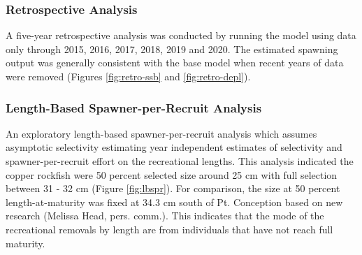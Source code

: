 \documentclass[11pt,
  english,
  a4paper,
]{article}
\begin{document}
\leavevmode\tagmcend\tagstructend\par


\hypertarget{retrospective-analysis}{%
\subsubsection{Retrospective Analysis}\label{retrospective-analysis}}

\leavevmode\tagmcend\tagstructend


A five-year retrospective analysis was conducted by running the model using data only through 2015, 2016, 2017, 2018, 2019 and 2020. The estimated spawning output was generally consistent with the base model when recent years of data were removed (Figures \ref{fig:retro-ssb} and \ref{fig:retro-depl}).

\leavevmode\tagmcend\tagstructend\par


\hypertarget{length-based-spawner-per-recruit-analysis}{%
\subsubsection{Length-Based Spawner-per-Recruit Analysis}\label{length-based-spawner-per-recruit-analysis}}

\leavevmode\tagmcend\tagstructend


An exploratory length-based spawner-per-recruit analysis which assumes asymptotic selectivity estimating year independent estimates of selectivity and spawner-per-recruit effort on the recreational lengths. This analysis indicated the copper rockfish were 50 percent selected size around 25 cm with full selection between 31 - 32 cm (Figure \ref{fig:lbspr}). For comparison, the size at 50 percent length-at-maturity was fixed at 34.3 cm south of Pt. Conception based on new research (Melissa Head, pers. comm.). This indicates that the mode of the recreational removals by length are from individuals that have not reach full maturity.

\leavevmode\tagmcend\tagstructend\par

\end{document}
